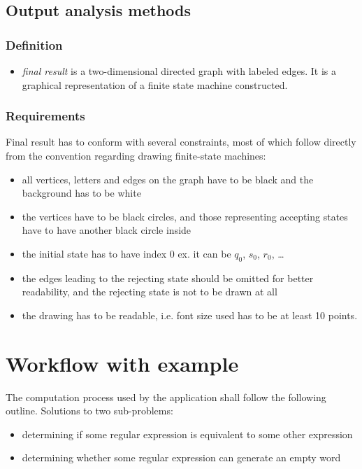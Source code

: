 \documentclass{article}
\begin{document}
\subsection{Output analysis methods}

\subsubsection*{Definition}
\begin{itemize}[noitemsep,nolistsep]

  \item \textit{final result} is a two-dimensional directed graph with labeled edges. It is a
  graphical representation of a finite state machine constructed.

\end{itemize}

\subsubsection*{Requirements}
Final result has to conform with several constraints, most of which follow directly from the
convention regarding drawing finite-state machines:
\begin{itemize}

  \item all vertices, letters and edges on the graph have to be black and the background has to be
  white

  \item the vertices have to be black circles, and those representing accepting states have to have
  another black circle inside

  \item the initial state has to have index $0$ ex. it can be $q_0$, $s_0$, $r_0$, \ldots

  \item the edges leading to the rejecting state should be omitted for better readability, and the
  rejecting state is not to be drawn at all

  \item the drawing has to be readable, i.e. font size used has to be at least 10 points.

\end{itemize}

\section{Workflow with example}
The computation process used by the application shall follow the following outline. Solutions to two
sub-problems:
\begin{itemize}

  \item determining if some regular expression is equivalent to some other expression

  \item determining whether some regular expression can generate an empty word

\end{itemize}
\end{document}

